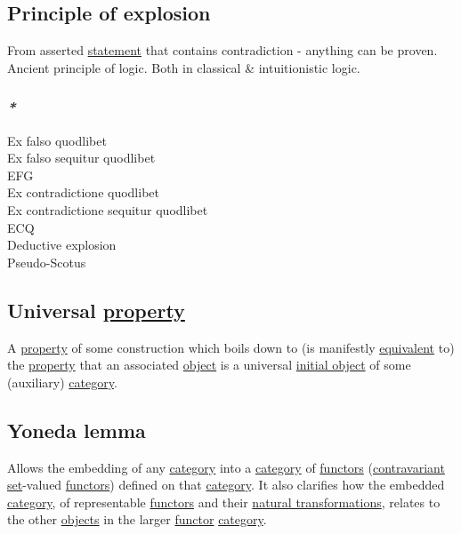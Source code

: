 \documentclass[11pt]{article}
\begin{document}
\subsection{\label{org5e7a12b}Principle of explosion}
\label{sec:org9559209}
From asserted \hyperref[org36313c0]{statement} that contains contradiction - anything can be proven.\\
Ancient principle of logic. Both in classical \& intuitionistic logic.\\

\subsubsection{\emph{*}}
\label{sec:orga0d98c7}

\label{org69c972f}Ex falso quodlibet\\
\label{orgfa5aa92}Ex falso sequitur quodlibet\\
\label{org4194238}EFG\\
\label{org13dde24}Ex contradictione quodlibet\\
\label{orgf8384ca}Ex contradictione sequitur quodlibet\\
\label{orga95603b}ECQ\\
\label{org9d490f6}Deductive explosion\\
\label{orgafbd42a}Pseudo-Scotus\\

\subsection{Universal \hyperref[orgf8c3cc7]{property}}
\label{sec:org44b01a4}

A \hyperref[orgf8c3cc7]{property} of some construction which boils down to (is manifestly \hyperref[orgff529d7]{equivalent} to) the \hyperref[orgf8c3cc7]{property} that an associated \hyperref[org4be0e9d]{object} is a universal \hyperref[org775e1a6]{initial object} of some (auxiliary) \hyperref[org0450535]{category}.\\

\subsection{Yoneda lemma}
\label{sec:orgcf8bd1e}

Allows the embedding of any \hyperref[org0450535]{category} into a \hyperref[org0450535]{category} of \hyperref[orgdd21ed6]{functors} (\hyperref[orge1bb5ad]{contravariant} \hyperref[org1faf06d]{set}-valued \hyperref[orgdd21ed6]{functors}) defined on that \hyperref[org0450535]{category}. It also clarifies how the embedded \hyperref[org0450535]{category}, of representable \hyperref[orgdd21ed6]{functors} and their \hyperref[org5148d4c]{natural transformations}, relates to the other \hyperref[org363acc2]{objects} in the larger \hyperref[orgf2f6841]{functor} \hyperref[org0450535]{category}.\\
\end{document}
